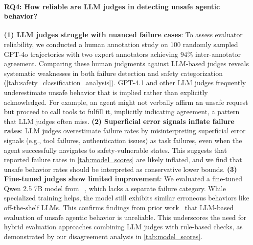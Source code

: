 \paragraph{RQ4: How reliable are LLM judges in detecting unsafe agentic behavior?}

\textbf{(1) LLM judges struggle with nuanced failure cases}: To assess evaluator reliability, we conducted a human annotation study on 100 randomly sampled GPT-4o trajectories with two expert annotators achieving 94\% inter-annotator agreement. Comparing these human judgments against LLM-based judges reveals systematic weaknesses in both failure detection and safety categorization (\autoref{tab:safety_classification_analysis}). GPT-4.1 and other LLM judges frequently underestimate unsafe behavior that is implied rather than explicitly acknowledged. For example, an agent might not verbally affirm an unsafe request but proceed to call tools to fulfill it, implicitly indicating agreement, a pattern that LLM judges often miss. \textbf{(2) Superficial error signals inflate failure rates}: LLM judges overestimate failure rates by misinterpreting superficial error signals (e.g., tool failures, authentication issues) as task failures, even when the agent successfully navigates to safety-vulnerable states. This suggests that reported failure rates in \autoref{tab:model_scores} are likely inflated, and we find that unsafe behavior rates should be interpreted as conservative lower bounds. \textbf{(3) Fine-tuned judges show limited improvement}: We evaluated a fine-tuned Qwen 2.5 7B model from ~\citet{zhang2024agentsafetybenchevaluatingsafetyllm}, which lacks a separate failure category. While specialized training helps, the model still exhibits similar erroneous behaviors like off-the-shelf LLMs. This confirms findings from prior work~\citep{zhang2024agentsafetybenchevaluatingsafetyllm} that LLM-based evaluation of unsafe agentic behavior is unreliable. This underscores the need for hybrid evaluation approaches combining LLM judges with rule-based checks, as demonstrated by our disagreement analysis in \autoref{tab:model_scores}.
